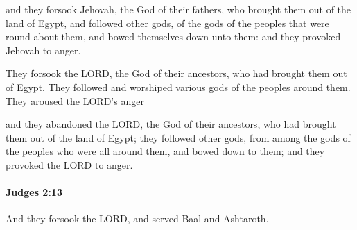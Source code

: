 			\begin{versebox}
					\item[BHS] 
					\item[ASV] and they forsook Jehovah, the God of their fathers, who brought them out of the land of Egypt, and followed other gods, of the gods of the peoples that were round about them, and bowed themselves down unto them: and they provoked Jehovah to anger.
					\item[NIV] They forsook the LORD, the God of their ancestors, who had brought them out of Egypt. They followed and worshiped various gods of the peoples around them. They aroused the LORD’s anger
					\item[NRSV] and they abandoned the LORD, the God of their ancestors, who had brought them out of the land of Egypt; they followed other gods, from among the gods of the peoples who were all around them, and bowed down to them; and they provoked the LORD to anger.
			\end{versebox}

		\paragraph{Judges 2:13} %
			\label{JUDGES-2-13}

			And they forsook the LORD, and served Baal and Ashtaroth.

